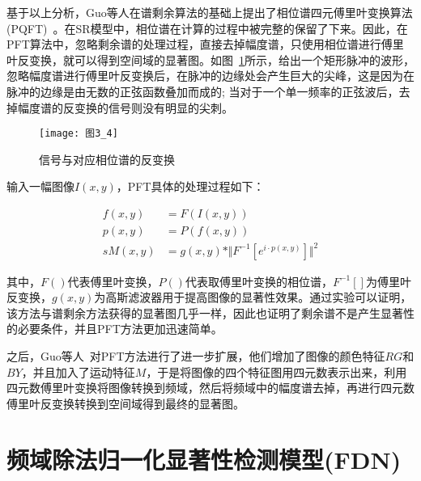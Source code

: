 基于以上分析，Guo等人在谱剩余算法的基础上提出了相位谱四元傅里叶变换算法(PQFT)~\cite{GuoChenleiCVPR2008Spatio}。在SR模型中，相位谱在计算的过程中被完整的保留了下来。因此，在PFT算法中，忽略剩余谱的处理过程，直接去掉幅度谱，只使用相位谱进行傅里叶反变换，就可以得到空间域的显著图。如图~\ref{图3_4}所示，给出一个矩形脉冲的波形，忽略幅度谱进行傅里叶反变换后，在脉冲的边缘处会产生巨大的尖峰，这是因为在脉冲的边缘是由无数的正弦函数叠加而成的; 当对于一个单一频率的正弦波后，去掉幅度谱的反变换的信号则没有明显的尖刺。
\begin{figure}[!t] %
\centering
\texttt{[image: 图3\_4]}
\caption{信号与对应相位谱的反变换}
\label{图3_4}
\end{figure}

输入一幅图像$I(x,y)$，PFT具体的处理过程如下：
\begin{linenomath}
\begin{align}
f(x,y) &= F(I(x,y))\label{式3_11}\\
p(x,y) &= P(f(x,y))\label{式3_12}\\
sM(x,y) &= g(x,y)\ast\Vert F^{-1}[e^{i\cdot p(x,y)}]\Vert^{2}\label{式3_13}
\end{align}
\end{linenomath}
其中，$F()$代表傅里叶变换，$P()$代表取傅里叶变换的相位谱，$F^{-1}[]$为傅里叶反变换，$g(x,y)$为高斯滤波器用于提高图像的显著性效果。通过实验可以证明，该方法与谱剩余方法获得的显著图几乎一样，因此也证明了剩余谱不是产生显著性的必要条件，并且PFT方法更加迅速简单。

之后，Guo等人~\cite{GuoChenleiCVPR2008Spatio}对PFT方法进行了进一步扩展，他们增加了图像的颜色特征$RG$和$BY$，并且加入了运动特征$M$，于是将图像的四个特征图用四元数表示出来，利用四元数傅里叶变换将图像转换到频域，然后将频域中的幅度谱去掉，再进行四元数傅里叶反变换转换到空间域得到最终的显著图。

\section{频域除法归一化显著性检测模型(FDN)}
\label{3_3}

